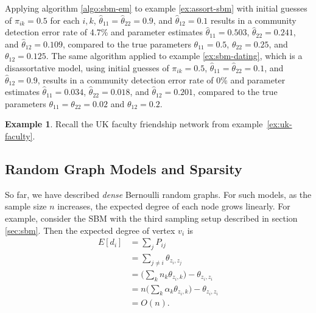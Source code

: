 \documentclass[
  12pt,
]{article}
\theoremstyle{definition}
\theoremstyle{definition}
\newtheorem{example}{Example}[section]
\theoremstyle{definition}
\theoremstyle{definition}
\theoremstyle{remark}
\begin{document}
Applying algorithm \ref{algo:sbm-em} to example \ref{ex:assort-sbm} with initial guesses of \(\pi_{ik} = 0.5\) for each \(i, k\), \(\hat{\theta}_{11} = \hat{\theta}_{22} = 0.9\), and \(\hat{\theta}_{12} = 0.1\) results in a community detection error rate of 4.7\% and parameter estimates \(\hat{\theta}_{11} = 0.503\), \(\hat{\theta}_{22} = 0.241\), and \(\hat{\theta}_{12} = 0.109\), compared to the true parameters \(\theta_{11} = 0.5\), \(\theta_{22} = 0.25\), and \(\theta_{12} = 0.125\).
The same algorithm applied to example \ref{ex:sbm-dating}, which is a disassortative model, using initial guesses of \(\pi_{ik} = 0.5\), \(\hat{\theta}_{11} = \hat{\theta}_{22} = 0.1\), and \(\hat{\theta}_{12} = 0.9\), results in a community detection error rate of 0\% and parameter estimates \(\hat{\theta}_{11} = 0.034\), \(\hat{\theta}_{22} = 0.018\), and \(\hat{\theta}_{12} = 0.201\), compared to the true parameters \(\theta_{11} = \theta_{22} = 0.02\) and \(\theta_{12} = 0.2\).

\begin{example}
\label{ex:uk-faculty-sbm}
Recall the UK faculty friendship network from example~\ref{ex:uk-faculty}. 
\end{example}

\hypertarget{sec:sparsity}{%
\subsection{Random Graph Models and Sparsity}\label{sec:sparsity}}

So far, we have described \emph{dense} Bernoulli random graphs.
For such models, as the sample size \(n\) increases, the expected degree of each node grows linearly.
For example, consider the SBM with the third sampling setup described in section \ref{sec:sbm}.
Then the expected degree of vertex \(v_i\) is
\[
\begin{split}
E[d_i] & = \sum_j P_{ij} \\
& = \sum_{j \neq i} \theta_{z_i, z_j} \\ 
& = \Big( \sum_k n_k \theta_{z_i, k} \Big) - \theta_{z_i, z_i} \\
& = n \Big( \sum_k \alpha_k \theta_{z_i, k} \Big) - \theta_{z_i, z_i} \\
& = O(n).
\end{split}
\]
\end{document}
